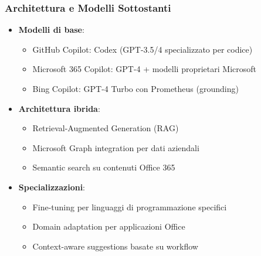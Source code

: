 \documentclass[aspectratio=169]{beamer}
\begin{document}
\begin{frame}
\frametitle{Architettura e Modelli Sottostanti}
\begin{itemize}
    \item \textbf{Modelli di base}:
    \begin{itemize}
        \item GitHub Copilot: Codex (GPT-3.5/4 specializzato per codice)
        \item Microsoft 365 Copilot: GPT-4 + modelli proprietari Microsoft
        \item Bing Copilot: GPT-4 Turbo con Prometheus (grounding)
    \end{itemize}
    \item \textbf{Architettura ibrida}:
    \begin{itemize}
        \item Retrieval-Augmented Generation (RAG)
        \item Microsoft Graph integration per dati aziendali
        \item Semantic search su contenuti Office 365
    \end{itemize}
    \item \textbf{Specializzazioni}:
    \begin{itemize}
        \item Fine-tuning per linguaggi di programmazione specifici
        \item Domain adaptation per applicazioni Office
        \item Context-aware suggestions basate su workflow
    \end{itemize}
\end{itemize}
\end{frame}
%
%
\end{document}
